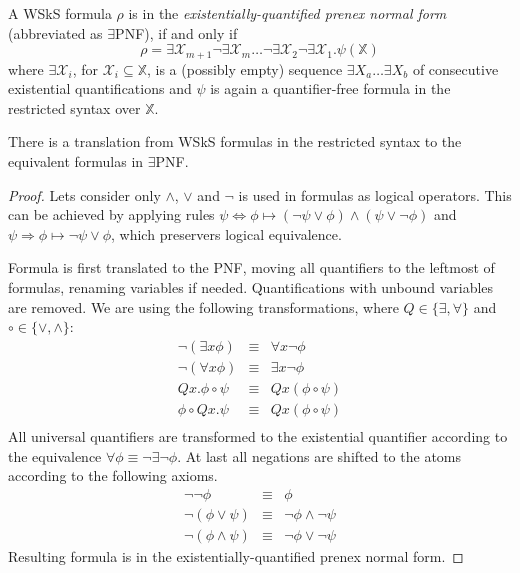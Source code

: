 	A WSkS formula $\rho$ is in the \emph{existentially-quantified prenex normal form} (abbreviated as $\exists$PNF), if and only if $$\rho = \exists \mathcal{X}_{m+1}\neg\exists \mathcal{X}_m\ldots\neg\exists \mathcal{X}_2\neg\exists \mathcal{X}_1.\psi(\mathds{X})$$ where $\exists\mathcal{X}_i$, for $\mathcal{X}_i \subseteq \mathds{X}$, is a (possibly empty) sequence $\exists X_a\ldots\exists X_b$ of consecutive existential quantifications and $\psi$ is again a quantifier-free formula in the restricted syntax over $\mathds{X}$.
	
	\begin{prop}
	 There is a translation from WSkS formulas in the restricted syntax to the equivalent formulas in $\exists$PNF. 
	\end{prop}
	
	\begin{proof}
	 Lets consider only $\wedge$, $\vee$ and $\neg$ is used in formulas as logical operators. This can be achieved by applying rules $\psi \Leftrightarrow \phi \mapsto (\neg \psi \vee \phi) \wedge (\psi \vee \neg \phi)$ and $\psi \Rightarrow \phi \mapsto \neg \psi \vee \phi$, which preservers logical equivalence.
	
	Formula is first translated to the PNF, moving all quantifiers to the leftmost of formulas, renaming variables if needed. Quantifications with unbound variables are removed. We are using the following transformations, where $Q \in \{\exists, \forall\}$ and $\circ \in \{\vee, \wedge\}$:
	\begin{eqnarray*}
	 \neg(\exists x \phi) & \equiv & \forall x\neg \phi\\
	 \neg(\forall x \phi) & \equiv & \exists x\neg \phi\\
	 Qx.\phi \circ \psi & \equiv & Qx(\phi \circ \psi)\\
	 \phi \circ Qx.\psi & \equiv & Qx(\phi \circ \psi)\\
	\end{eqnarray*}
	All universal quantifiers are transformed to the existential quantifier according to the equivalence $\forall \phi \equiv \neg\exists\neg\phi$. At last all negations are shifted to the atoms according to the following axioms.
	\begin{eqnarray*}
	 \neg\neg\phi & \equiv & \phi\\
	 \neg(\phi\vee \psi) & \equiv & \neg \phi \wedge \neg \psi\\
	 \neg(\phi\wedge \psi) & \equiv & \neg \phi \vee \neg \psi 
	\end{eqnarray*}
 Resulting formula is in the existentially-quantified prenex normal form. 
	\end{proof}
	
